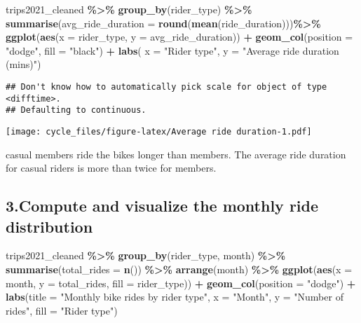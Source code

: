 \documentclass[
]{article}
\newenvironment{Shaded}{\begin{snugshade}}{\end{snugshade}}
\newcommand{\AttributeTok}[1]{\textcolor[rgb]{0.13,0.29,0.53}{#1}}
\newcommand{\FunctionTok}[1]{\textcolor[rgb]{0.13,0.29,0.53}{\textbf{#1}}}
\newcommand{\NormalTok}[1]{#1}
\newcommand{\SpecialCharTok}[1]{\textcolor[rgb]{0.81,0.36,0.00}{\textbf{#1}}}
\newcommand{\StringTok}[1]{\textcolor[rgb]{0.31,0.60,0.02}{#1}}
\begin{document}
\begin{Shaded}
\begin{Highlighting}[]
\NormalTok{trips2021\_cleaned }\SpecialCharTok{\%\textgreater{}\%} 
  \FunctionTok{group\_by}\NormalTok{(rider\_type) }\SpecialCharTok{\%\textgreater{}\%} 
  \FunctionTok{summarise}\NormalTok{(}\AttributeTok{avg\_ride\_duration =} \FunctionTok{round}\NormalTok{(}\FunctionTok{mean}\NormalTok{(ride\_duration)))}\SpecialCharTok{\%\textgreater{}\%} 
  \FunctionTok{ggplot}\NormalTok{(}\FunctionTok{aes}\NormalTok{(}\AttributeTok{x =}\NormalTok{ rider\_type, }\AttributeTok{y =}\NormalTok{ avg\_ride\_duration)) }\SpecialCharTok{+} 
  \FunctionTok{geom\_col}\NormalTok{(}\AttributeTok{position =} \StringTok{"dodge"}\NormalTok{, }\AttributeTok{fill =} \StringTok{"black"}\NormalTok{) }\SpecialCharTok{+}
  \FunctionTok{labs}\NormalTok{( }\AttributeTok{x =} \StringTok{"Rider type"}\NormalTok{, }\AttributeTok{y =} \StringTok{"Average ride duration (mins)"}\NormalTok{)}
\end{Highlighting}
\end{Shaded}

\begin{verbatim}
## Don't know how to automatically pick scale for object of type <difftime>.
## Defaulting to continuous.
\end{verbatim}

\texttt{[image: cycle\_files/figure-latex/Average ride duration-1.pdf]}

casual members ride the bikes longer than members. The average ride
duration for casual riders is more than twice for members.

\hypertarget{compute-and-visualize-the-monthly-ride-distribution}{%
\subsection{3.Compute and visualize the monthly ride
distribution}\label{compute-and-visualize-the-monthly-ride-distribution}}

\begin{Shaded}
\begin{Highlighting}[]
\NormalTok{trips2021\_cleaned }\SpecialCharTok{\%\textgreater{}\%} 
  \FunctionTok{group\_by}\NormalTok{(rider\_type, month) }\SpecialCharTok{\%\textgreater{}\%} 
  \FunctionTok{summarise}\NormalTok{(}\AttributeTok{total\_rides =} \FunctionTok{n}\NormalTok{()) }\SpecialCharTok{\%\textgreater{}\%} 
  \FunctionTok{arrange}\NormalTok{(month) }\SpecialCharTok{\%\textgreater{}\%} 
  \FunctionTok{ggplot}\NormalTok{(}\FunctionTok{aes}\NormalTok{(}\AttributeTok{x =}\NormalTok{ month, }\AttributeTok{y =}\NormalTok{ total\_rides, }\AttributeTok{fill =}\NormalTok{ rider\_type)) }\SpecialCharTok{+}
  \FunctionTok{geom\_col}\NormalTok{(}\AttributeTok{position =} \StringTok{"dodge"}\NormalTok{) }\SpecialCharTok{+}
  \FunctionTok{labs}\NormalTok{(}\AttributeTok{title =} \StringTok{"Monthly bike rides by rider type"}\NormalTok{,}
       \AttributeTok{x =} \StringTok{"Month"}\NormalTok{, }\AttributeTok{y =} \StringTok{"Number of rides"}\NormalTok{, }\AttributeTok{fill =} \StringTok{"Rider type"}\NormalTok{)}
\end{Highlighting}
\end{Shaded}
\end{document}

